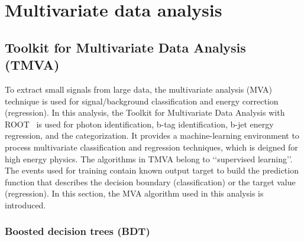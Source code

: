 \chapter{Multivariate data analysis} %

\label{Chapter3} %

\section{Toolkit for Multivariate Data Analysis (TMVA)}\label{sec:TMVA}

To extract small signals from large data, the multivariate analysis (MVA) technique is used for signal/background classification and energy correction (regression).
In this analysis, the Toolkit for Multivariate Data Analysis with ROOT~\cite{Hocker:2007ht} is used for photon identification, b-tag identification, b-jet energy regression, and the categorization. 
It provides a machine-learning environment to process multivariate classification and regression techniques, which is deigned for high energy physics.
The algorithms in TMVA belong to \lq\lq supervised learning\rq\rq .
The events used for training contain known output target to build the prediction function that describes the decision boundary (classification) or the target value (regression).
In this section, the MVA algorithm used in this analysis is introduced.

\subsection{Boosted decision trees (BDT)}

